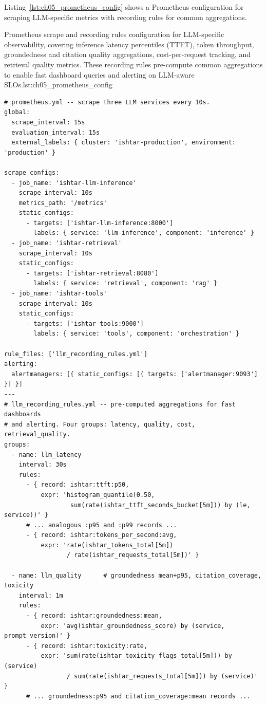 Listing~\ref{lst:ch05_prometheus_config} shows a Prometheus configuration for scraping LLM-specific metrics with recording rules for common aggregations.

\begin{codebox}{Prometheus scrape and recording rules configuration for LLM-specific observability, covering inference latency percentiles (TTFT), token throughput, groundedness and citation quality aggregations, cost-per-request tracking, and retrieval quality metrics. These recording rules pre-compute common aggregations to enable fast dashboard queries and alerting on LLM-aware SLOs.}{lst:ch05_prometheus_config}
\begin{verbatim}
# prometheus.yml -- scrape three LLM services every 10s.
global:
  scrape_interval: 15s
  evaluation_interval: 15s
  external_labels: { cluster: 'ishtar-production', environment: 'production' }

scrape_configs:
  - job_name: 'ishtar-llm-inference'
    scrape_interval: 10s
    metrics_path: '/metrics'
    static_configs:
      - targets: ['ishtar-llm-inference:8000']
        labels: { service: 'llm-inference', component: 'inference' }
  - job_name: 'ishtar-retrieval'
    scrape_interval: 10s
    static_configs:
      - targets: ['ishtar-retrieval:8080']
        labels: { service: 'retrieval', component: 'rag' }
  - job_name: 'ishtar-tools'
    scrape_interval: 10s
    static_configs:
      - targets: ['ishtar-tools:9000']
        labels: { service: 'tools', component: 'orchestration' }

rule_files: ['llm_recording_rules.yml']
alerting:
  alertmanagers: [{ static_configs: [{ targets: ['alertmanager:9093'] }] }]
---
# llm_recording_rules.yml -- pre-computed aggregations for fast dashboards
# and alerting. Four groups: latency, quality, cost, retrieval_quality.
groups:
  - name: llm_latency
    interval: 30s
    rules:
      - { record: ishtar:ttft:p50,
          expr: 'histogram_quantile(0.50,
                  sum(rate(ishtar_ttft_seconds_bucket[5m])) by (le, service))' }
      # ... analogous :p95 and :p99 records ...
      - { record: ishtar:tokens_per_second:avg,
          expr: 'rate(ishtar_tokens_total[5m])
                 / rate(ishtar_requests_total[5m])' }

  - name: llm_quality      # groundedness mean+p95, citation_coverage, toxicity
    interval: 1m
    rules:
      - { record: ishtar:groundedness:mean,
          expr: 'avg(ishtar_groundedness_score) by (service, prompt_version)' }
      - { record: ishtar:toxicity:rate,
          expr: 'sum(rate(ishtar_toxicity_flags_total[5m])) by (service)
                 / sum(rate(ishtar_requests_total[5m])) by (service)' }
      # ... groundedness:p95 and citation_coverage:mean records ...


\end{verbatim}
\end{codebox}
